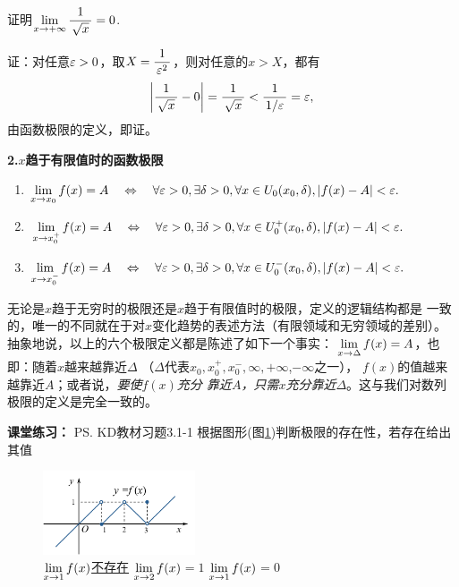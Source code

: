 \bs

\egz 证明$\lim\limits_{x\to{+\infty}}\displaystyle\frac{\,{1}\,}{\,{\sqrt x}\,}=0$.

证：对任意$\varepsilon>0$，取$X=\displaystyle\frac{\,{1}\,}{\,{\varepsilon^2}\,}$，则对任意的$x>X$，都有
$$\left|\displaystyle\frac{\,{1}\,}{\,{\sqrt x}\,}-0\right|=\displaystyle\frac{\,{1}\,}{\,{\sqrt x}\,}<\displaystyle\frac{\,{1}\,}{\,{1/\varepsilon}\,}=\varepsilon,$$
由函数极限的定义，即证。\fin

\bs

{\bf 2.\;$x$趋于有限值时的函数极限}
\begin{thx}
	\begin{enumerate}%
	  \item $\lim\limits_{x\to{x_0}}f(x)=A\quad\Leftrightarrow\quad
	  \forall \varepsilon>0,\exists\delta>0,\forall
	  x\in U_0(x_0,\delta),|f(x)-A|<\varepsilon.$
	  \item $\lim\limits_{x\to{x_0^+}}f(x)=A\quad\Leftrightarrow\quad
	  \forall \varepsilon>0,\exists\delta>0,\forall x\in
	  U_0^+(x_0,\delta),|f(x)-A|<\varepsilon.$
	  \item $\lim\limits_{x\to{x_0^-}}f(x)=A\quad\Leftrightarrow\quad
	  \forall \varepsilon>0,\exists\delta>0,\forall
	  x\in U_0^-(x_0,\delta),|f(x)-A|<\varepsilon.$
	\end{enumerate}
\end{thx}

无论是$x$趋于无穷时的极限还是$x$趋于有限值时的极限，定义的逻辑结构都是
一致的，唯一的不同就在于对$x$变化趋势的表述方法（有限领域和无穷领域的差别）。
抽象地说，以上的六个极限定义都是陈述了如下一个事实：{\kaishu 
$\lim\limits_{x\to{\Delta}}f(x)=A$，也即：随着$x$越来越靠近$\Delta$
（$\Delta$代表$x_0,x_0^+,x_0^-,\infty,+\infty$,$-\infty$之一），
$f(x)$的值越来越靠近$A$}；或者说，{\it 要使$f(x)$充分
靠近$A$，只需$x$充分靠近$\Delta$}。这与我们对数列极限的定义是完全一致的。

\bs

{\bf 课堂练习：} \ps{KD教材习题3.1-1}
根据图形(图\ref{fig:limxexist})判断极限的存在性，若存在给出其值
\begin{figure}[h]
	\centering
	\includegraphics[width=0.4\textwidth]{./Images/Ch01/limxf.pdf}
	\caption{$\lim\limits_{x\to{1}}f(x)$\underline{不存在}
	\quad $\lim\limits_{x\to{2}}f(x)$\underline{$=1$}
	\quad $\lim\limits_{x\to{1}}f(x)$\underline{$=0$}}
	\label{fig:limxexist}
\end{figure}

